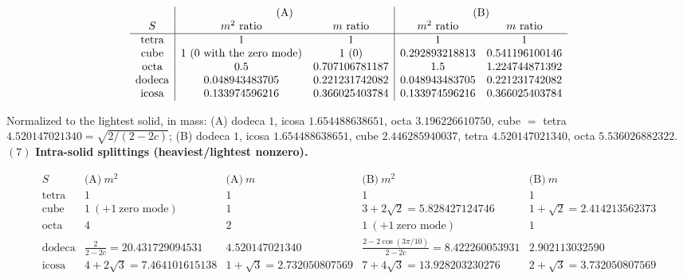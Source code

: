 \begin{theorem}
\[
\begin{array}{c|cc|cc}
& \multicolumn2{c|}{\text{(A)}} & \multicolumn2{c}{\text{(B)}}\\
S & m^2\ \text{ratio} & m\ \text{ratio} & m^2\ \text{ratio} & m\ \text{ratio}\\
\hline
\text{tetra} & 1 & 1 & 1 & 1\\
\text{cube} & 1\ (0\ \text{with the zero mode}) & 1\ (0) & 0.292893218813 & 0.541196100146\\
\text{octa} & 0.5 & 0.707106781187 & 1.5 & 1.224744871392\\
\text{dodeca} & 0.048943483705 & 0.221231742082 & 0.048943483705 & 0.221231742082\\
\text{icosa} & 0.133974596216 & 0.366025403784 & 0.133974596216 & 0.366025403784
\end{array}
\]

Normalized to the lightest solid, in mass: (A) dodeca $1$, icosa $1.654488638651$, octa $3.196226610750$, cube $=$ tetra $4.520147021340=\sqrt{2/(2-2c)}$; (B) dodeca $1$, icosa $1.654488638651$, cube $2.446285940037$, tetra $4.520147021340$, octa $5.536026882322$. $(7)$ \textbf{Intra-solid splittings (heaviest/lightest nonzero).}

\[
\begin{array}{c|cc|cc}
S & \text{(A)}\ m^2 & \text{(A)}\ m & \text{(B)}\ m^2 & \text{(B)}\ m\\
\hline
\text{tetra} & 1 & 1 & 1 & 1\\
\text{cube} & 1\ (+1\ \text{zero mode}) & 1 & 3{+}2\sqrt2=5.828427124746 & 1{+}\sqrt2=2.414213562373\\
\text{octa} & 4 & 2 & 1\ (+1\ \text{zero mode}) & 1\\
\text{dodeca} & \tfrac{2}{2-2c}=20.431729094531 & 4.520147021340 & \tfrac{2-2\cos(3\pi/10)}{2-2c}=8.422260053931 & 2.902113032590\\
\text{icosa} & 4{+}2\sqrt3=7.464101615138 & 1{+}\sqrt3=2.732050807569 & 7{+}4\sqrt3=13.928203230276 & 2{+}\sqrt3=3.732050807569
\end{array}
\]


\end{theorem}
